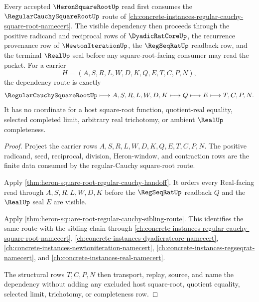 \begin{theorem}
\label{thm:heron-square-root-regular-cauchy-dependency}
Every accepted $\HeronSquareRootUp$ read first consumes the $\RegularCauchySquareRootUp$ route of \autoref{ch:concrete-instances-regular-cauchy-square-root-namecert}. The visible dependency then proceeds through the positive radicand and reciprocal rows of $\DyadicRatCoreUp$, the recurrence provenance row of $\NewtonIterationUp$, the $\RegSeqRatUp$ readback row, and the terminal $\RealUp$ seal before any square-root-facing consumer may read the packet. For a carrier
$$
H=(A,S,R,L,W,D,K,Q,E,T,C,P,N),
$$
the dependency route is exactly
$$
\RegularCauchySquareRootUp \longmapsto A,S,R,L,W,D,K \longmapsto Q \longmapsto E \longmapsto T,C,P,N .
$$
It has no coordinate for a host square-root function, quotient-real equality, selected completed limit, arbitrary real trichotomy, or ambient $\RealUp$ completeness.
\end{theorem}
\begin{proof}
Project the carrier rows $A,S,R,L,W,D,K,Q,E,T,C,P,N$. The positive radicand, seed, reciprocal, division, Heron-window, and contraction rows are the finite data consumed by the regular-Cauchy square-root route.

Apply \autoref{thm:heron-square-root-regular-cauchy-handoff}. It orders every Real-facing read through $A,S,R,L,W,D,K$ before the $\RegSeqRatUp$ readback $Q$ and the $\RealUp$ seal $E$ are visible.

Apply \autoref{thm:heron-square-root-regular-cauchy-sibling-route}. This identifies the same route with the sibling chain through \autoref{ch:concrete-instances-regular-cauchy-square-root-namecert}, \autoref{ch:concrete-instances-dyadicratcore-namecert}, \autoref{ch:concrete-instances-newtoniteration-namecert}, \autoref{ch:concrete-instances-regseqrat-namecert}, and \autoref{ch:concrete-instances-real-namecert}.

The structural rows $T,C,P,N$ then transport, replay, source, and name the dependency without adding any excluded host square-root, quotient equality, selected limit, trichotomy, or completeness row.
\end{proof}
